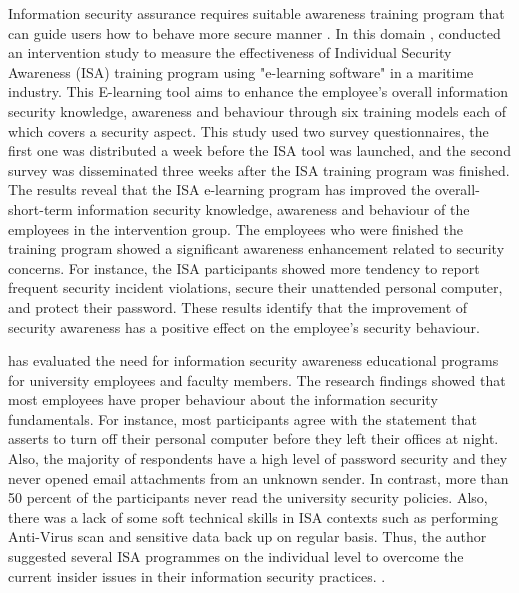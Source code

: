 Information security assurance requires suitable awareness training program that can guide users how to behave more secure manner \cite{safa2015information}. In this domain , \citet{merete2009effects} conducted an intervention study to measure the effectiveness of Individual Security  Awareness (ISA) training program using "e-learning software" in a maritime industry. This E-learning tool aims to enhance the employee's overall information security knowledge, awareness and behaviour through six training models each of which covers a security aspect. This study used two survey questionnaires, the first one was distributed a week before the ISA tool was launched, and the second survey was disseminated three weeks after the ISA training program was finished. The results reveal that the ISA e-learning program has improved the overall- short-term information security knowledge, awareness and behaviour of the employees in the intervention group. The employees who were finished the training program showed a significant awareness enhancement related to security concerns. For instance, the ISA participants showed more tendency to report frequent security incident violations, secure their unattended personal computer, and protect their password. These results identify that the improvement of security awareness has a positive effect on the employee's security behaviour.

\citet{Katz2005} has evaluated the need for information security awareness educational programs for university employees and faculty members. The research findings showed that most employees have proper behaviour about the information security fundamentals. For instance, most participants agree with the statement that asserts to turn off their personal computer before they left their offices at night. Also, the majority of respondents have a high level of password security and they never opened email attachments from an unknown sender. In contrast, more than 50 percent of the participants never read the university security policies. Also, there was a lack of some soft technical skills in ISA contexts such as performing Anti-Virus scan and sensitive data back up on regular basis. Thus, the author suggested several ISA programmes on the individual level to overcome the current insider issues in their information security practices. .
